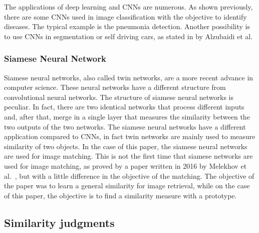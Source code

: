 \documentclass[conference]{IEEEtran}
\begin{document}
				The applications of deep learning and CNNs are numerous. As shown previously, there are some CNNs used in image classification with the objective to identify diseases. The typical example is 
				the pneumonia detection. Another possibility is to use CNNs in segmentation or self driving cars, as stated in \cite{alzubaidi2021review} by Alzubaidi et al.
		
			\subsubsection{Siamese Neural Network}

				Siamese neural networks, also called twin networks, are a more recent advance in computer science. These neural networks have a different structure from convolutional neural networks. The 
				structure of siamese neural networks is peculiar. In fact, there are two identical networks that process different inputs and, after that, merge in a single layer that measures the similarity between 
				the two outputs of the two networks. The siamese neural networks have a different application compared to CNNs, in fact twin networks are mainly used to measure similarity of two objects. 
				In the case of this paper, the siamese neural networks are used for image matching. This is not the first time that siamese networks are used for image matching, as proved by a paper written in 2016 by 
				Melekhov et al.~\cite{melekhov2016siamese}, but with a little difference in the objective of the matching. The objective of the paper was to learn a general similarity for image retrieval, while on the case of this 
				paper, the objective is to find a similarity measure with a prototype. 
		
		\subsection{Similarity judgments}
			
\end{document}
